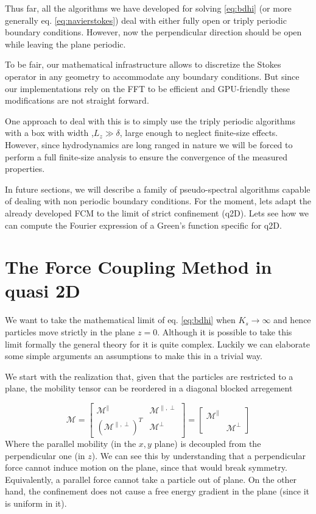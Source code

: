 \documentclass[ twoside,openright,titlepage,numbers=noenddot,%
headinclude,footinclude,cleardoublepage=empty,abstract=on,
BCOR=5mm,paper=a4,fontsize=11pt, dvipsnames
]{scrreprt}
\newcommand{\tens}[1]{\bm{\mathcal{#1}}}
\newcommand{\gpu}{\gls{GPU}\xspace}
\begin{document}
Thus far, all the algorithms we have developed for solving \eqref{eq:bdhi} (or more generally eq. \eqref{eq:navierstokes}) deal with either fully open or triply periodic boundary conditions. However, now the perpendicular direction should be open while leaving the plane periodic.

To be fair, our mathematical infrastructure allows to discretize the Stokes operator in any geometry to accommodate any boundary conditions. But since our implementations rely on the \gls{FFT} to be efficient and \gpu-friendly these modifications are not straight forward. 

One approach to deal with this is to simply use the triply periodic algorithms with a box with width ,$L_z\gg \delta$, large enough to neglect finite-size effects. However, since hydrodynamics are long ranged in nature we will be forced to perform a full finite-size analysis to ensure the convergence of the measured properties.

In future sections, we will describe a family of pseudo-spectral algorithms capable of dealing with non periodic boundary conditions. For the moment, lets adapt the already developed \gls{FCM} to the limit of strict confinement (q2D). Lets see how we can compute the Fourier expression of a Green's function specific for q2D.

\section{The Force Coupling Method in quasi 2D}

We want to take the mathematical limit of eq. \eqref{eq:bdhi} when $K_s\rightarrow\infty$ and hence particles move strictly in the plane $z=0$. Although it is possible to take this limit formally the general theory for it is quite complex. Luckily we can elaborate some simple arguments an assumptions to make this in a trivial way.

We start with the realization that, given that the particles are restricted to a plane, the mobility tensor can be reordered in a diagonal blocked arregement 

\begin{equation}
\tens M=\left[\begin{array}{cc}
\tens M^{\parallel} & \tens M^{\parallel,\perp}\\
\left(\tens M^{\parallel,\perp}\right)^{T} & \tens M^{\perp}
\end{array}\right]=\left[\begin{array}{cc}
\tens M^{\parallel}\\
 & \tens M^{\perp}
\end{array}\right]
\end{equation}
Where the parallel mobility (in the $x,y$ plane) is decoupled from the perpendicular one (in $z$). We can see this by understanding that a perpendicular force cannot induce motion on the plane, since that would break symmetry. Equivalently, a parallel force cannot take a particle out of plane. On the other hand, the confinement does not cause a free energy gradient in the plane (since it is uniform in it).
\end{document}
